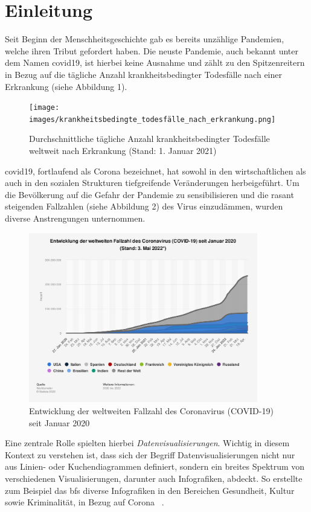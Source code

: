 \section{Einleitung}
Seit Beginn der Menschheitsgeschichte gab es bereits unzählige Pandemien, welche ihren Tribut gefordert haben. Die neuste Pandemie, auch bekannt unter dem Namen \Gls{covid19}, ist hierbei keine Ausnahme und zählt zu den Spitzenreitern in Bezug auf die tägliche Anzahl krankheitsbedingter Todesfälle nach einer Erkrankung (siehe Abbildung 1).

\begin{figure}[ht]
    \texttt{[image: images/krankheitsbedingte\_todesfälle\_nach\_erkrankung.png]}
    \centering
    \caption{Durchschnittliche tägliche Anzahl krankheitsbedingter Todesfälle weltweit nach Erkrankung (Stand:
1. Januar 2021) ~\citep[S. 12]{worldwide_epidemic_cases_study}}
\end{figure}

\Gls{covid19}, fortlaufend als Corona bezeichnet, hat sowohl in den wirtschaftlichen als auch in den sozialen Strukturen tiefgreifende Veränderungen herbeigeführt. Um die Bevölkerung auf die Gefahr der Pandemie zu sensibilisieren und die rasant steigenden Fallzahlen (siehe Abbildung 2) des Virus einzudämmen, wurden diverse Anstrengungen unternommen.

\begin{figure}[ht]
    \includegraphics[width=10cm]{images/corona_fallzahlen.png}
    \centering
    \caption{Entwicklung der weltweiten Fallzahl des Coronavirus (COVID-19) seit Januar 2020 ~\citep{covid_cases_worldwide}}
\end{figure}

Eine zentrale Rolle spielten hierbei \textit{Datenvisualisierungen}. Wichtig in diesem Kontext zu verstehen ist, dass sich der Begriff Datenvisualisierungen nicht nur aus Linien- oder Kuchendiagrammen definiert, sondern ein breites Spektrum von verschiedenen Visualisierungen, darunter auch Infografiken, abdeckt. So erstellte zum Beispiel das \Gls{bfs} diverse Infografiken in den Bereichen Gesundheit, Kultur sowie Kriminalität, in Bezug auf Corona ~\citep{covid19_bfs_infografiken}.

